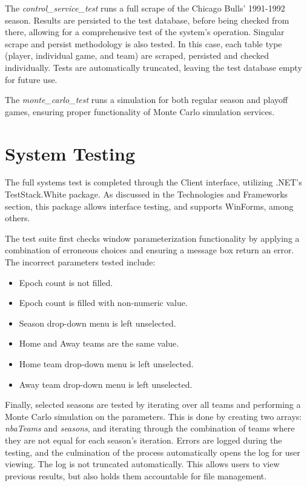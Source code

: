 \documentclass{thesis-ekf}
\theoremstyle{definition}
\theoremstyle{remark}
\begin{document}
The \emph{control\_service\_test} runs a full scrape of the Chicago Bulls' 1991-1992 season. Results are persisted to the test database, before being checked from there, allowing for a comprehensive test of the system's operation. Singular scrape and persist methodology is also tested. In this case, each table type (player, individual game, and team) are scraped, persisted and checked individually. Tests are automatically truncated, leaving the test database empty for future use.

The \emph{monte\_carlo\_test} runs a simulation for both regular season and playoff games, ensuring proper functionality of Monte Carlo simulation services.

\section{System Testing} \label{sec-sys-tst}
The full systems test is completed through the Client interface, utilizing .NET's TestStack.White package. As discussed in the Technologies and Frameworks section, this package allows interface testing, and supports WinForms, among others.

The test suite first checks window parameterization functionality by applying a combination of erroneous choices and ensuring a message box return an error. The incorrect parameters tested include:
\begin{itemize}
	\item Epoch count is not filled.
	\item Epoch count is filled with non-numeric value.
	\item Season drop-down menu is left unselected.
	\item Home and Away teams are the same value.
	\item Home team drop-down menu is left unselected.
	\item Away team drop-down menu is left unselected.
\end{itemize}

Finally, selected seasons are tested by iterating over all teams and performing a Monte Carlo simulation on the parameters. This is done by creating two arrays: \emph{nbaTeams} and \emph{seasons}, and iterating through the combination of teams where they are not equal for each season's iteration. Errors are logged during the testing, and the culmination of the process automatically opens the log for user viewing. The log is not truncated automatically. This allows users to view previous results, but also holds them accountable for file management.
\end{document}
